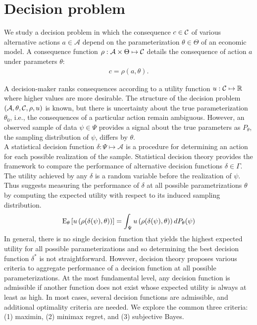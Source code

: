\section*{Decision problem}
We study a decision problem in which the consequence $c \in \mathcal{C}$ of various alternative actions $a\in\mathcal{A}$ depend on the parameterization $\theta\in \Theta$ of an economic model. A consequence function $\rho: \mathcal{A} \times \Theta \mapsto \mathcal{C}$  details the consequence of action $a$ under parameters $\theta$:
%
\begin{align*}
c = \rho(a, \theta).
\end{align*}

A decision-maker ranks consequences according to a utility function $u: \mathcal{C} \mapsto \mathbb{R}$ where higher values are more desirable. The structure of the decision problem $(\mathcal{A}, \theta, \mathcal{C}, \rho, u)$ is known, but there is uncertainty about the true parameterization $\theta_0$, i.e., the consequences of a particular action remain ambiguous. However, an observed sample of data $\psi \in \Psi$ provides a signal about the true parameters as $P_{\theta}$, the sampling distribution of $\psi$, differs by $\theta$.\\

A statistical decision function $\delta: \Psi \mapsto \mathcal{A}$ is a procedure for determining an action for each possible realization of the sample. Statistical decision theory provides the framework to compare the performance of alternative decision functions  $\delta \in \Gamma$. The utility achieved by any $\delta$ is a random variable before the realization of $\psi$. Thus \citet{Wald.1950} suggests measuring the performance of $\delta$ at all possible parametrizations $\theta$ by computing the expected utility with respect to its induced sampling distribution.
%
\begin{align*}
  \mathrm{E}_{\theta}\left[u\left(\rho(\delta(\psi), \theta)\right)\right] = \int_\Psi u\left(\rho(\delta(\psi), \theta)\right) d P_{\theta}(\psi)
\end{align*}
%
In general, there is no single decision function that yields the highest expected utility for all possible parameterizations and so determining the best decision function  $\delta^*$ is not straightforward. However, decision theory proposes various criteria \citep{Gilboa.2009,Marinacci.2015} to aggregate performance of a decision function at all possible parameterizations. At the most fundamental level, any decision function is admissible if another function does not exist whose expected utility is always at least as high. In most cases, several decision functions are admissible, and additional optimality criteria are needed. We explore the common three criteria: (1) maximin, (2) minimax regret, and (3) subjective Bayes.\\

